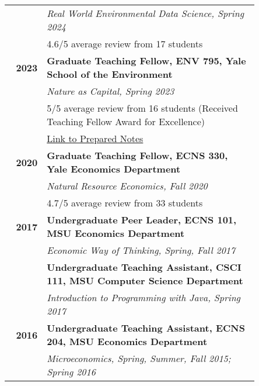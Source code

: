 \documentclass[11pt]{article}
\begin{document}
\begin{longtable}{>{\bfseries}r p{0.85\linewidth}}
    & \textit{Real World Environmental Data Science, Spring 2024} \\
    & 4.6/5 average review from 17 students \\
2023 & \textbf{Graduate Teaching Fellow, ENV 795, Yale School of the Environment} \\
    & \textit{Nature as Capital, Spring 2023} \\
    & 5/5 average review from 16 students (Received Teaching Fellow Award for Excellence)\\
    & \href{https://github.com/a5creel/nature_as_capital}{Link to Prepared Notes} \\[1ex]
2020 & \textbf{Graduate Teaching Fellow, ECNS 330, Yale Economics Department} \\
    & \textit{Natural Resource Economics, Fall 2020} \\
    & 4.7/5 average review from 33 students \\[1ex]
2017 & \textbf{Undergraduate Peer Leader, ECNS 101, MSU Economics Department} \\
    & \textit{Economic Way of Thinking, Spring, Fall 2017} \\[1ex]
    & \textbf{Undergraduate Teaching Assistant, CSCI 111, MSU Computer Science Department} \\
    & \textit{Introduction to Programming with Java, Spring 2017} \\[1ex]
2016 & \textbf{Undergraduate Teaching Assistant, ECNS 204, MSU Economics Department} \\
    & \textit{Microeconomics, Spring, Summer, Fall 2015; Spring 2016} \\
\end{longtable}
\end{document}

